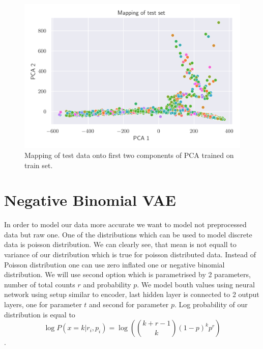 \documentclass[12pt,a4paper]{article}
\begin{document}
\begin{figure}[H]
    \begin{center}
        \includegraphics[scale=1]{src/gaussian_pca_100.png}
    \end{center}
    \caption{Mapping of test data onto first two components of PCA trained on train set.}
    \label{fig:pca_gauss}
\end{figure}
\section{Negative Binomial VAE}
In order to model our data more accurate we want to model not preprocessed data but raw one. One of the distributions which can be used to model discrete data
is poisson distribution. We can clearly see, that mean is not equall to variance of our distribution which is true for poisson distributed data. 
Instead of Poisson distribution one can use zero inflated one or negative binomial distribution. We will use second option which is parametrised by 2 parameters,
number of total counts $r$ and probability $p$. We model bouth values using neural network using setup similar to encoder, last hidden layer is connected to 
2 output layers, one for parameter $t$ and second for parameter $p$. Log probability of our distribution is equal to
\begin{equation}
    \log{P(x=k|r_i,p_i)}=\log{\left({k+r-1\choose k}(1-p)^k p^r\right)}
\end{equation}.
\end{document}
